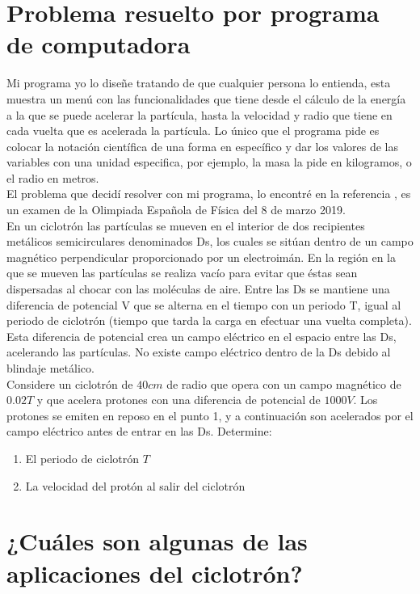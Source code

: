 \documentclass[12pt]{article}
\begin{document}
		\section{Problema resuelto por programa de computadora}\label{sec:INTRODUCCIÓN}
			Mi programa yo lo diseñe tratando de que cualquier persona lo entienda, esta muestra un menú con las 
			funcionalidades que tiene desde el cálculo de la energía a la que se puede acelerar la partícula, hasta 
			la velocidad y radio que tiene en cada vuelta que es acelerada la partícula. Lo único que el programa 
			pide es colocar la notación científica de una forma en específico y dar los valores de las variables 
			con una unidad especifica, por ejemplo, la masa la pide en kilogramos, o el radio en metros.\\
			El problema que decidí resolver con mi programa, lo encontré en la referencia \cite{bib:item11}, es un examen de la 
			Olimpiada Española de Física del 8 de marzo 2019.\\
			En un ciclotrón las partículas se mueven en el interior de dos recipientes metálicos semicirculares 
			denominados Ds, los cuales se sitúan dentro de un campo magnético perpendicular proporcionado 
			por un electroimán. En la región en la que se mueven las partículas se realiza vacío para evitar que 
			éstas sean dispersadas al chocar con las moléculas de aire. Entre las Ds se mantiene una diferencia de 
			potencial V que se alterna en el tiempo con un periodo T, igual al periodo de ciclotrón (tiempo que 
			tarda la carga en efectuar una vuelta completa). Esta diferencia de potencial crea un campo eléctrico 
			en el espacio entre las Ds, acelerando las partículas. No existe campo eléctrico dentro de la Ds debido 
			al blindaje metálico.\\
			Considere un ciclotrón de $ 40 cm $ de radio que opera con un campo magnético de $ 0.02 T $ y que acelera protones 
			con una diferencia de potencial de $ 1000 V $. Los protones se emiten en reposo en el punto 1, y a continuación 
			son acelerados por el campo eléctrico antes de entrar en las Ds. Determine:
			\begin{enumerate}
				\item El periodo de ciclotrón $ T $
				\item La velocidad del protón al salir del ciclotrón
			\end{enumerate}

		\section{¿Cuáles son algunas de las aplicaciones del ciclotrón?}\label{sec:¿Cuáles son algunas de las aplicaciones del ciclotrón?}
		
\end{document}
